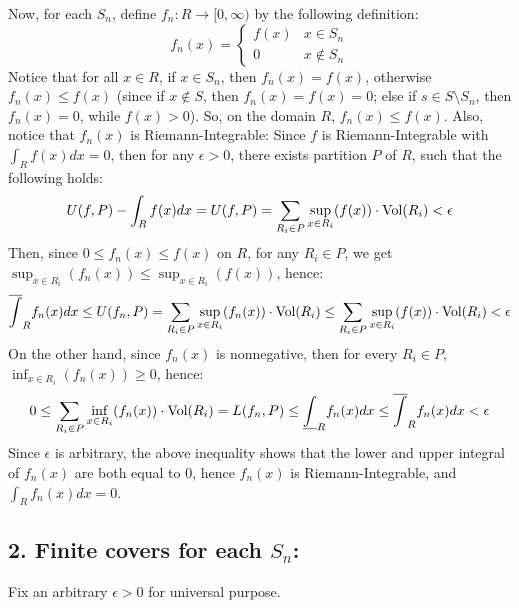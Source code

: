 \documentclass{article}
\begin{document}
Now, for each $S_n$, define $f_n:R\rightarrow[0,\infty)$ by the following definition:
\begin{equation}
    f_n(x)=\begin{cases}
        f(x) & x\in S_n\\
        0 & x\notin S_n
    \end{cases}
\end{equation}
Notice that for all $x\in R$, if $x\in S_n$, then $f_n(x)=f(x)$, otherwise $f_n(x)\leq f(x)$ (since if $x\notin S$, then $f_n(x)=f(x)=0$; else if $s\in S\setminus S_n$, then $f_n(x)=0$, while $f(x)>0$). So, on the domain $R$, $f_n(x)\leq f(x)$.
Also, notice that $f_n(x)$ is Riemann-Integrable: Since $f$ is Riemann-Integrable with $\int_Rf(x)dx = 0$, then for any $\epsilon>0$, there exists partition $P$ of $R$, such that the following holds:
\begin{equation}
    U(f,P) - \int_Rf(x)dx = U(f,P) = \sum_{R_i\in P}\sup_{x\in R_i}(f(x))\cdot \textmd{Vol}(R_i)<\epsilon
\end{equation}
Then, since $0\leq f_n(x)\leq f(x)$ on $R$, for any $R_i\in P$, we get $\sup_{x\in R_i}(f_n(x))\leq \sup_{x\in R_i}(f(x))$, hence:
\begin{equation}
    \overline{\int}_{R}f_n(x)dx \leq U(f_n,P) = \sum_{R_i\in P}\sup_{x\in R_i}(f_n(x))\cdot \textmd{Vol}(R_i) \leq \sum_{R_i\in P}\sup_{x\in R_i}(f(x))\cdot \textmd{Vol}(R_i)<\epsilon
\end{equation}
On the other hand, since $f_n(x)$ is nonnegative, then for every $R_i\in P$, $\inf_{x\in R_i}(f_n(x))\geq 0$, hence:
\begin{equation}
    0\leq \sum_{R_i\in P}\inf_{x\in R_i}(f_n(x))\cdot \textmd{Vol}(R_i) = L(f_n,P) \leq \underline{\int}_{R}f_n(x)dx \leq \overline{\int}_Rf_n(x)dx < \epsilon
\end{equation}
Since $\epsilon$ is arbitrary, the above inequality shows that the lower and upper integral of $f_n(x)$ are both equal to $0$, hence $f_n(x)$ is Riemann-Integrable, and $\int_Rf_n(x)dx = 0$.

\subsection*{2. Finite covers for each $S_n$:}
Fix an arbitrary $\epsilon>0$ for universal purpose. 
\end{document}
